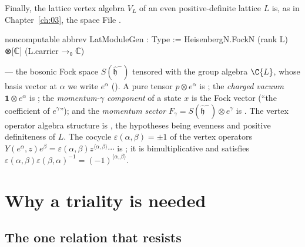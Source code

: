 Finally, the lattice vertex algebra $V_L$ of an even positive-definite lattice $L$ is, as in
Chapter~\ref{ch:03}, the space
\noindent File .
\begin{leancode}
noncomputable abbrev LatModuleGen : Type :=
  HeisenbergN.FockN (rank L) ⊗[ℂ] (L.carrier →₀ ℂ)
\end{leancode}
--- the bosonic Fock space $S(\hat{\mathfrak h}^-)$ tensored with the group algebra $\C\{L\}$,
whose basis vector at $\alpha$ we write $e^\alpha$ ().  A pure tensor
$p\otimes e^\alpha$ is ; the \emph{charged vacuum} $\mathbf 1\otimes e^\alpha$
is ; the \emph{momentum-$\gamma$ component} of a state $x$ is the Fock vector
 (``the coefficient of $e^\gamma$''); and the \emph{momentum sector}
$F_\gamma=S(\hat{\mathfrak h}^-)\otimes e^\gamma$ is .  The vertex operator
algebra structure is , the hypotheses being evenness and positive
definiteness of $L$.  The cocycle $\varepsilon(\alpha,\beta)=\pm1$ of the vertex operators
$Y(e^\alpha,z)e^\beta=\varepsilon(\alpha,\beta)z^{\langle\alpha,\beta\rangle}\cdots$ is
; it is bimultiplicative and satisfies
$\varepsilon(\alpha,\beta)\varepsilon(\beta,\alpha)^{-1}=(-1)^{\langle\alpha,\beta\rangle}$.

\section{Why a triality is needed}\label{ch11:sec:strategy}

\subsection{The one relation that resists}

